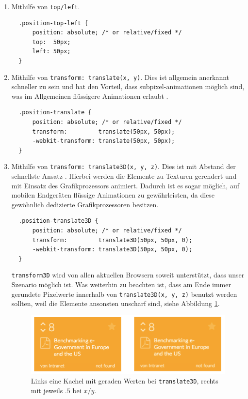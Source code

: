 \documentclass[12pt,twoside]{book}
\begin{document}
\begin{enumerate}
  \item Mithilfe von \texttt{top/left}.\\
  \begin{verbatim}
  .position-top-left {
      position: absolute; /* or relative/fixed */
      top:  50px;
      left: 50px;
  }
  \end{verbatim}
  \item Mithilfe von \texttt{transform: translate(x, y)}. Dies ist allgemein anerkannt schneller zu sein und hat den Vorteil, dass subpixel-animationen möglich sind, was im Allgemeinen flüssigere Animationen erlaubt \cite{translate}. \\
  \begin{verbatim}
  .position-translate {
      position: absolute; /* or relative/fixed */
      transform:         translate(50px, 50px);
      -webkit-transform: translate(50px, 50px);
  }
  \end{verbatim}
  \item Mithilfe von \texttt{transform: translate3D(x, y, z)}. Dies ist mit Abstand der schnellste Ansatz \cite{translate3dvstranslate}. Hierbei werden die Elemente zu Texturen gerendert und mit Einsatz des Grafikprozessors animiert. Dadurch ist es sogar möglich, auf mobilen Endgeräten flüssige Animationen zu gewährleisten, da diese gewöhnlich dedizierte Grafikprozessoren besitzen.
  \begin{verbatim}
  .position-translate3D {
      position: absolute; /* or relative/fixed */
      transform:         translate3D(50px, 50px, 0);
      -webkit-transform: translate3D(50px, 50px, 0);
  }
  \end{verbatim}
  \texttt{transform3D} wird von allen aktuellen Browsern soweit unterstützt, dass unser Szenario möglich ist\cite{transform3d}. Was weiterhin zu beachten ist, dass am Ende immer gerundete Pixelwerte innerhalb von \texttt{translate3D(x, y, z)} benutzt werden sollten, weil die Elemente ansonsten unscharf sind, siehe Abbildung \ref{fig:blurry}.

\begin{figure}[htbp]
	\centering
	\includegraphics[width=1.0\textwidth]{images/blurry_tiles.png}
	\caption{Links eine Kachel mit geraden Werten bei \texttt{translate3D}, rechts mit jeweils $.5$ bei $x/y$.}
	\label{fig:blurry}
\end{figure}

\end{enumerate}
\end{document}
